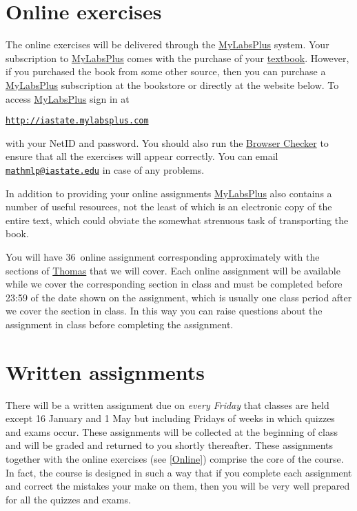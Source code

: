 \documentclass[11pt]{article}
\begin{document}
\section{Online exercises}\label{Online}
The online exercises will be delivered through the
\href{http://iastate.mylabsplus.com}{MyLabsPlus} system.
Your subscription to 
\href{http://iastate.mylabsplus.com}{MyLabsPlus}
comes with the purchase of your
\href{http://wps.aw.com/aw_thomas_calculus_series}{textbook}.
However, if you purchased the book from some other source,
then you can purchase a 
\href{http://iastate.mylabsplus.com}{MyLabsPlus}
subscription at the bookstore or directly at the website below.
To access
\href{http://iastate.mylabsplus.com}{MyLabsPlus}
sign in at
\begin{center}
\href{http://iastate.mylabsplus.com}{\tt http://iastate.mylabsplus.com}
\end{center}
with your NetID and password.
You should also run the
\href{https://www.mathxl.com/BrowserCheck/BrowserCheck.aspx?appproductid=3&courseid=2744761&handler_urn=pearson%2fmlp_mml_xl%2fslink%2fx-pearson-mlp_mml_xl&productid=ccng}{Browser Checker}
to ensure that all the exercises will appear correctly.
You can email \href{mailto://mathmlp@iastate.edu}{\tt mathmlp@iastate.edu}
in case of any problems.

In addition to providing your online assignments
\href{http://iastate.mylabsplus.com}{MyLabsPlus}
also contains a number of useful resources, not the least of which is an
electronic copy of the entire text, which could obviate
the somewhat strenuous task of transporting the book.

You will have 36~online assignment corresponding
approximately with the sections of 
\href{http://wps.aw.com/aw_thomas_calculus_series}{Thomas}
that we will cover. Each online assignment will be available while we cover the
corresponding section in class and must be completed
before 23:59 of the date shown on the assignment, which
is usually one class period after we cover the section in class.
In this way you can raise questions about
the assignment in class before completing the assignment.

\section{Written assignments}\label{Written}
There will be a written assignment due on {\em every 
Friday} that classes are held
except 16 January and 1 May
but including Fridays of weeks
in which quizzes and exams occur.
These assignments will be collected at the beginning
of class and will be graded and returned to you shortly thereafter.
These assignments together with the online exercises
(see \autoref{Online}) comprise the core of the course.
In fact, the course is 
designed in such a way that if you complete each assignment and 
correct the mistakes your make on them,
then you will be very well prepared for all the quizzes and exams.
\end{document}
